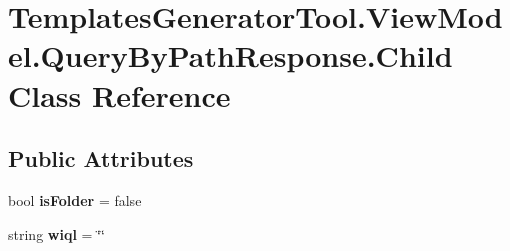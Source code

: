 \hypertarget{class_templates_generator_tool_1_1_view_model_1_1_query_by_path_response_1_1_child}{}\section{Templates\+Generator\+Tool.\+View\+Model.\+Query\+By\+Path\+Response.\+Child Class Reference}
\label{class_templates_generator_tool_1_1_view_model_1_1_query_by_path_response_1_1_child}
\subsection*{Public Attributes}
\begin{DoxyCompactItemize}
\item 
\mbox{\label{class_templates_generator_tool_1_1_view_model_1_1_query_by_path_response_1_1_child_afca84df39c872f848a85c7bfa541190f}} 
bool {\bfseries is\+Folder} = false
\item 
\mbox{\label{class_templates_generator_tool_1_1_view_model_1_1_query_by_path_response_1_1_child_adb5a2daa5ed69117be8bdae07b3c435d}} 
string {\bfseries wiql} = \char`\"{}\char`\"{}
\end{DoxyCompactItemize}
